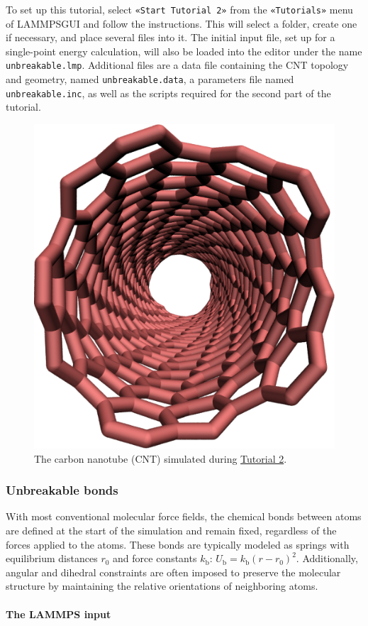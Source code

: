 \documentclass[9pt,tutorial]{livecoms}
\newcommand{\flecmd}[1]{\textcolor{command}{\texttt{#1}}} %
\newcommand{\guicmd}[1]{\textcolor{command}{\texttt{«#1»}}} %
\newcommand{\lammpsgui}{\textsf{LAMMPS\textendash GUI}}
\begin{document}
To set up this tutorial, select \guicmd{Start Tutorial 2} from the
\guicmd{Tutorials} menu of \lammpsgui{} and follow the instructions.  This will
select a folder, create one if necessary, and place several files into it.
The initial input file, set up for a single-point energy
calculation, will also be loaded into the editor under the name
\flecmd{unbreakable.lmp}.  Additional files are a data file containing the
CNT topology and geometry, named \flecmd{unbreakable.data}, a parameters file
named \flecmd{unbreakable.inc}, as well as the scripts required for the second part
of the tutorial.

\begin{figure}
\centering
\includegraphics[width=0.55\linewidth]{CNT}
\caption{The carbon nanotube (CNT) simulated during
\hyperref[carbon-nanotube-label]{Tutorial 2}.}
\label{fig:CNT}
\end{figure}

\subsubsection{Unbreakable bonds}

With most conventional molecular force fields, the chemical bonds between
atoms are defined at the start of the simulation and remain fixed, regardless
of the forces applied to the atoms.  These bonds are typically modeled as springs
with equilibrium distances $r_0$ and force constants $k_\text{b}$:
$U_\text{b} = k_\text{b} \left( r - r_0 \right)^2$.  Additionally, angular and
dihedral constraints are often imposed to preserve the molecular structure
by maintaining the relative orientations of neighboring atoms.

\paragraph{The LAMMPS input}
\end{document}
